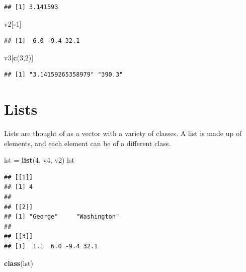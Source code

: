 \documentclass[
]{book}
\newenvironment{Shaded}{\begin{snugshade}}{\end{snugshade}}
\newcommand{\DecValTok}[1]{\textcolor[rgb]{0.00,0.00,0.81}{#1}}
\newcommand{\KeywordTok}[1]{\textcolor[rgb]{0.13,0.29,0.53}{\textbf{#1}}}
\newcommand{\NormalTok}[1]{#1}
\newcommand{\OperatorTok}[1]{\textcolor[rgb]{0.81,0.36,0.00}{\textbf{#1}}}
\newcommand{\StringTok}[1]{\textcolor[rgb]{0.31,0.60,0.02}{#1}}
\begin{document}
\begin{verbatim}
## [1] 3.141593
\end{verbatim}

\begin{Shaded}
\begin{Highlighting}[]
\NormalTok{v2[}\OperatorTok{-}\DecValTok{1}\NormalTok{]}
\end{Highlighting}
\end{Shaded}

\begin{verbatim}
## [1]  6.0 -9.4 32.1
\end{verbatim}

\begin{Shaded}
\begin{Highlighting}[]
\NormalTok{v3[}\KeywordTok{c}\NormalTok{(}\DecValTok{3}\NormalTok{,}\DecValTok{2}\NormalTok{)]}
\end{Highlighting}
\end{Shaded}

\begin{verbatim}
## [1] "3.14159265358979" "390.3"
\end{verbatim}

\hypertarget{lists}{%
\section{Lists}\label{lists}}

Lists are thought of as a vector with a variety of classes. A list is made up of elements, and each element can be of a different class.

\begin{Shaded}
\begin{Highlighting}[]
\NormalTok{lst =}\StringTok{ }\KeywordTok{list}\NormalTok{(}\DecValTok{4}\NormalTok{, v4, v2)}
\NormalTok{lst}
\end{Highlighting}
\end{Shaded}

\begin{verbatim}
## [[1]]
## [1] 4
## 
## [[2]]
## [1] "George"     "Washington"
## 
## [[3]]
## [1]  1.1  6.0 -9.4 32.1
\end{verbatim}

\begin{Shaded}
\begin{Highlighting}[]
\KeywordTok{class}\NormalTok{(lst)}
\end{Highlighting}
\end{Shaded}
\end{document}
